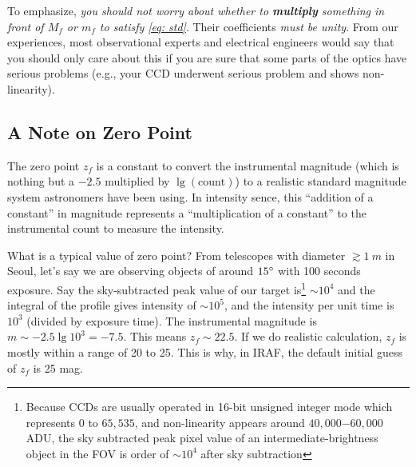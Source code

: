 To emphasize, \emph{you should not worry about whether to \textbf{multiply} something in front of $ M_f $ or $ m_f $ to satisfy \cref{eq: std}}. Their coefficients \emph{must be unity}. From our experiences, most observational experts and electrical engineers would say that you should only care about this if you are sure that some parts of the optics have serious problems (e.g., your CCD underwent serious problem and shows non-linearity). 

\subsection{A Note on Zero Point} \label{ss: zeropt}
The zero point $ z_{f} $ is a constant to convert the instrumental magnitude (which is nothing but a $ -2.5 $ multiplied by $ \lg (\mathrm{count}) $) to a realistic standard magnitude system astronomers have been using. In intensity sence, this ``addition of a constant'' in magnitude represents a ``multiplication of a constant'' to the instrumental count to measure the intensity. 


What is a typical value of zero point? From telescopes with diameter $ \gtrsim \SI{1}{m} $ in Seoul, let's say we are observing objects of around $ \m{15} $ with 100 seconds exposure. Say the sky-subtracted peak value of our target is\footnote{Because CCDs are usually operated in 16-bit unsigned integer mode which represents $ 0 $ to $ 65,535 $, and non-linearity appears around $ 40,000\mathrm{-}60,000 $ ADU, the sky subtracted peak pixel value of an intermediate-brightness object in the FOV is order of $ \sim 10^4 $ after sky subtraction} $ \sim 10^4 $ and the integral of the profile gives intensity of $ \sim 10^{5} $, and the intensity per unit time is $ 10^3 $ (divided by exposure time). The instrumental magnitude is $ m \sim -2.5 \lg 10^3 = -7.5 $. This means $ z_f \sim 22.5 $. If we do realistic calculation, $ z_f $ is mostly within a range of 20 to 25. This is why, in IRAF, the default initial guess of $ z_f $ is 25 mag.

